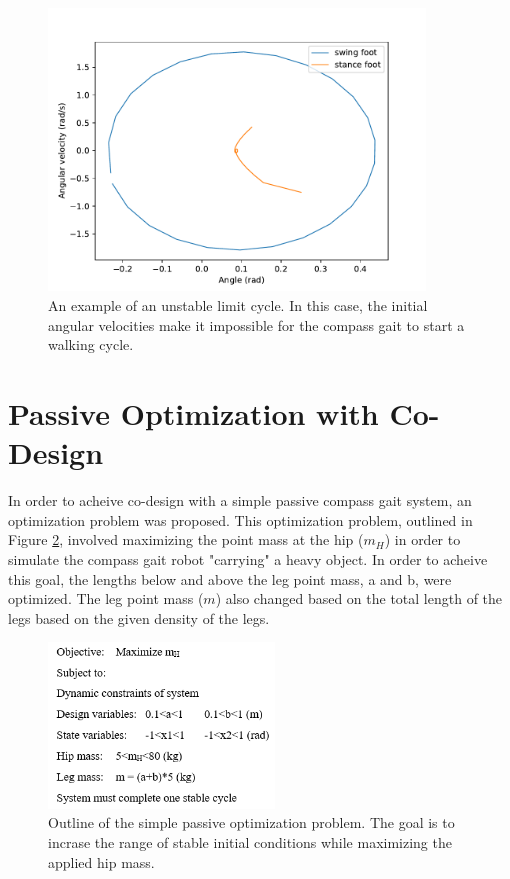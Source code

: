 \documentclass{./springer/svjour3}
\begin{document}
\begin{figure}[!h]
\centering
\includegraphics[width=10cm]{./figures/unstable_onecycle.pdf}
\caption{An example of an unstable limit cycle. In this case, the initial angular velocities make it impossible for the compass gait to start a walking cycle.}
\label{fig:unstable_onecycle}
\end{figure}

\clearpage

\section{Passive Optimization with Co-Design}

In order to acheive co-design with a simple passive compass gait system, an optimization problem was proposed.
This optimization problem, outlined in Figure \ref{fig:optsetup}, involved maximizing the point mass at the hip ($m_H$) in order to simulate the
compass gait robot "carrying" a heavy object. In order to acheive this goal, the lengths below and above the leg point mass, a and b, were optimized.
The leg point mass ($m$) also changed based on the total length of the legs based on the given density of the legs.

\begin{figure}[!h]
\centering
\includegraphics[width=6cm]{./figures/opt1prob.png}
\caption{Outline of the simple passive optimization problem. The goal is to incrase the range of stable initial conditions while maximizing the applied hip mass.}
\label{fig:optsetup}
\end{figure}
\end{document}
